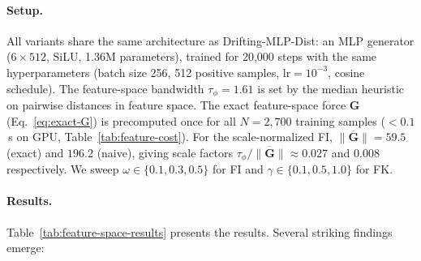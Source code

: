 \documentclass[11pt]{article}
\newcommand{\bG}{\mathbf{G}}
\begin{document}
\paragraph{Setup.}
All variants share the same architecture as Drifting-MLP-Dist: an MLP generator ($6 \times 512$, SiLU, 1.36M parameters), trained for 20,000 steps with the same hyperparameters (batch size 256, 512 positive samples, $\text{lr} = 10^{-3}$, cosine schedule).
The feature-space bandwidth $\tau_\phi = 1.61$ is set by the median heuristic on pairwise distances in feature space.
The exact feature-space force $\bG$ (Eq.~\ref{eq:exact-G}) is precomputed once for all $N = 2{,}700$ training samples ($< 0.1$\,s on GPU, Table~\ref{tab:feature-cost}).
For the scale-normalized FI, $\overline{\|\bG\|} = 59.5$ (exact) and $196.2$ (naive), giving scale factors $\tau_\phi/\overline{\|\bG\|} \approx 0.027$ and $0.008$ respectively.
We sweep $\omega \in \{0.1, 0.3, 0.5\}$ for FI and $\gamma \in \{0.1, 0.5, 1.0\}$ for FK.

\paragraph{Results.}
Table~\ref{tab:feature-space-results} presents the results.
Several striking findings emerge:
\end{document}

